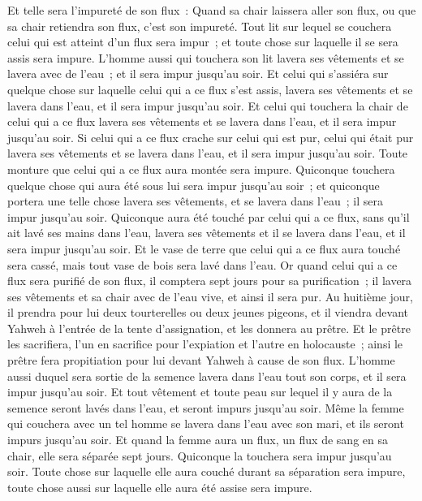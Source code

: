 \begin{multicols}{2}
Et telle sera l'impureté de son flux~: Quand sa chair laissera aller son flux, ou que sa chair retiendra son flux, c'est son impureté.
Tout lit sur lequel se couchera celui qui est atteint d'un flux sera impur~; et toute chose sur laquelle il se sera assis sera impure.
L'homme aussi qui touchera son lit lavera ses vêtements et se lavera avec de l'eau~; et il sera impur jusqu'au soir.
Et celui qui s'assiéra sur quelque chose sur laquelle celui qui a ce flux s'est assis, lavera ses vêtements et se lavera dans l'eau, et il sera impur jusqu'au soir.
Et celui qui touchera la chair de celui qui a ce flux lavera ses vêtements et se lavera dans l'eau, et il sera impur jusqu'au soir.
Si celui qui a ce flux crache sur celui qui est pur, celui qui était pur lavera ses vêtements et se lavera dans l'eau, et il sera impur jusqu'au soir.
Toute monture que celui qui a ce flux aura montée sera impure.
Quiconque touchera quelque chose qui aura été sous lui sera impur jusqu'au soir~; et quiconque portera une telle chose lavera ses vêtements, et se lavera dans l'eau~; il sera impur jusqu'au soir.
Quiconque aura été touché par celui qui a ce flux, sans qu'il ait lavé ses mains dans l'eau, lavera ses vêtements et il se lavera dans l'eau, et il sera impur jusqu'au soir.
Et le vase de terre que celui qui a ce flux aura touché sera cassé, mais tout vase de bois sera lavé dans l'eau.
Or quand celui qui a ce flux sera purifié de son flux, il comptera sept jours pour sa purification~; il lavera ses vêtements et sa chair avec de l'eau vive, et ainsi il sera pur.
Au huitième jour, il prendra pour lui deux tourterelles ou deux jeunes pigeons, et il viendra devant Yahweh à l'entrée de la tente d'assignation, et les donnera au prêtre.
Et le prêtre les sacrifiera, l'un en sacrifice pour l'expiation et l'autre en holocauste~; ainsi le prêtre fera propitiation pour lui devant Yahweh à cause de son flux.
L'homme aussi duquel sera sortie de la semence lavera dans l'eau tout son corps, et il sera impur jusqu'au soir.
Et tout vêtement et toute peau sur lequel il y aura de la semence seront lavés dans l'eau, et seront impurs jusqu'au soir.
Même la femme qui couchera avec un tel homme se lavera dans l'eau avec son mari, et ils seront impurs jusqu'au soir.
Et quand la femme aura un flux, un flux de sang en sa chair, elle sera séparée sept jours. Quiconque la touchera sera impur jusqu'au soir.
Toute chose sur laquelle elle aura couché durant sa séparation sera impure, toute chose aussi sur laquelle elle aura été assise sera impure.

\end{multicols}

